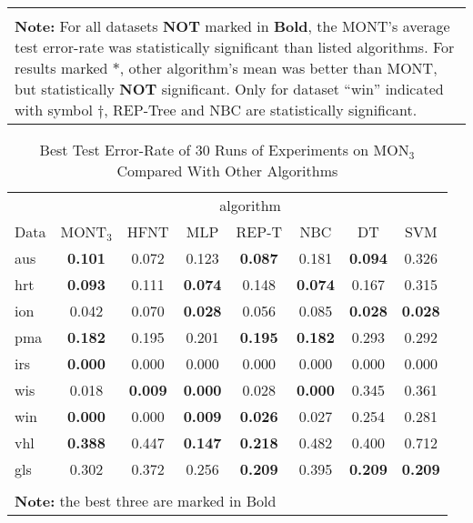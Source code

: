 \documentclass[conference]{IEEEtran}
\begin{document}
\begin{table}
\begin{center}
\begin{tabular}{llrrrrrr}
            \hline
            \\[-6pt]
            \multicolumn{8}{p{8cm}}{\textbf{Note:} For all datasets \textbf{NOT} marked in \textbf{Bold}, the MONT's average test error-rate was statistically significant than listed algorithms. For results marked $ * $, other algorithm's mean was better than MONT, but statistically \textbf{NOT} significant.  Only for dataset ``win'' indicated with symbol $ \dagger $, REP-Tree and NBC are statistically significant.}
        \end{tabular}
    \end{center}
\end{table}

\begin{table}
    \begin{center}
        \renewcommand{\arraystretch}{1.1}
        \setlength{\tabcolsep}{5pt}
        {\caption{Best Test Error-Rate of 30 Runs of Experiments on MON$_3$ Compared With Other Algorithms}
            \label{tab:nt_vs_all_best}}
        \begin{tabular}{lccccccc}
            \hline
            &    \multicolumn{7}{c}{algorithm} \\
            \cline{2-8}
            Data  & MONT$_3$    & HFNT & MLP  & REP-T      & NBC    & DT     & SVM   \\
            \hline
            aus    &  \textbf{0.101} & 0.072 & 0.123 &  \textbf{0.087}  & 0.181 &  \textbf{0.094}  & 0.326 \\
            hrt    &  \textbf{0.093}  & 0.111 & \textbf{0.074}  & 0.148 &  \textbf{0.074}  & 0.167 & 0.315 \\
            ion    & 0.042 & 0.070 & \textbf{0.028}  & 0.056 & 0.085 &  \textbf{0.028}  &  \textbf{0.028}   \\
            pma    &  \textbf{0.182} & 0.195 & 0.201 &  \textbf{0.195}  &  \textbf{0.182}  & 0.293 & 0.292 \\
            irs   & \textbf{0.000} & 0.000 & 0.000 & 0.000 & 0.000 & 0.000 & 0.000 \\
            wis  &  0.018 & \textbf{0.009} &  \textbf{0.000} & 0.028 &  \textbf{0.000} & 0.345 & 0.361 \\
            win    &  \textbf{0.000} & 0.000 &  \textbf{0.009}  &  \textbf{0.026}  & 0.027 & 0.254 & 0.281 \\
            vhl    &  \textbf{0.388} & 0.447 &  \textbf{0.147}  &  \textbf{0.218}  & 0.482 & 0.400 & 0.712 \\
            gls    & 0.302 & 0.372 & 0.256 &  \textbf{0.209}  & 0.395 &  \textbf{0.209}  &  \textbf{0.209}   \\	
            \hline
            \\[-6pt]
            \multicolumn{7}{l}{\textbf{Note:} the best three are marked in Bold}
        \end{tabular}
    \end{center}
\end{table}
\end{document}
